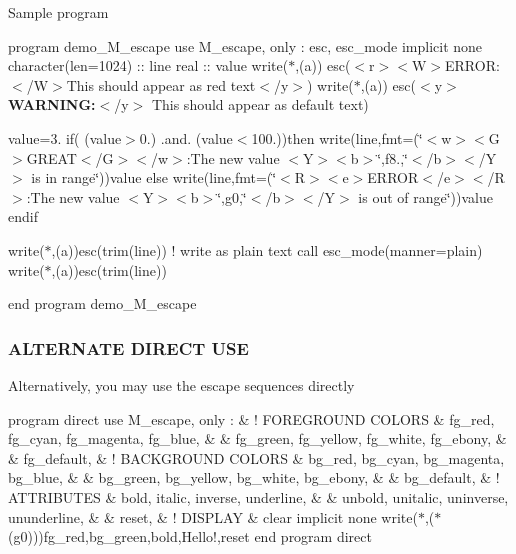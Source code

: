 Sample program

program demo\+\_\+\+M\+\_\+escape use M\+\_\+escape, only \+: esc, esc\+\_\+mode implicit none character(len=1024) \+:\+: line real \+:\+: value write($\ast$,\textquotesingle{}(a)\textquotesingle{}) esc(\textquotesingle{}$<$r$>$$<$\+W$>$E\+R\+R\+OR\+:$<$/\+W$>$This should appear as red text$<$/y$>$\textquotesingle{}) write($\ast$,\textquotesingle{}(a)\textquotesingle{}) esc(\textquotesingle{}$<$y$>${\bfseries W\+A\+R\+N\+I\+NG\+:}$<$/y$>$ This should appear as default text\textquotesingle{})

value=3. if( (value$>$0.) .and. (value$<$100.))then write(line,fmt=\textquotesingle{}(\char`\"{}$<$w$>$$<$\+G$>$\+G\+R\+E\+A\+T$<$/\+G$>$$<$/w$>$\+:\+The new value $<$\+Y$>$$<$b$>$\char`\"{},f8.,\char`\"{}$<$/b$>$$<$/\+Y$>$ is in range\char`\"{})\textquotesingle{})value else write(line,fmt=\textquotesingle{}(\char`\"{}$<$\+R$>$$<$e$>$\+E\+R\+R\+O\+R$<$/e$>$$<$/\+R$>$\+:\+The new value $<$\+Y$>$$<$b$>$\char`\"{},g0,\char`\"{}$<$/b$>$$<$/\+Y$>$ is out of range\char`\"{})\textquotesingle{})value endif

write($\ast$,\textquotesingle{}(a)\textquotesingle{})esc(trim(line)) ! write as plain text call esc\+\_\+mode(manner=\textquotesingle{}plain\textquotesingle{}) write($\ast$,\textquotesingle{}(a)\textquotesingle{})esc(trim(line))

end program demo\+\_\+\+M\+\_\+escape

\subsubsection*{A\+L\+T\+E\+R\+N\+A\+TE D\+I\+R\+E\+CT U\+SE}

Alternatively, you may use the escape sequences directly

program direct use M\+\_\+escape, only \+: \& ! F\+O\+R\+E\+G\+R\+O\+U\+ND C\+O\+L\+O\+RS \& fg\+\_\+red, fg\+\_\+cyan, fg\+\_\+magenta, fg\+\_\+blue, \& \& fg\+\_\+green, fg\+\_\+yellow, fg\+\_\+white, fg\+\_\+ebony, \& \& fg\+\_\+default, \& ! B\+A\+C\+K\+G\+R\+O\+U\+ND C\+O\+L\+O\+RS \& bg\+\_\+red, bg\+\_\+cyan, bg\+\_\+magenta, bg\+\_\+blue, \& \& bg\+\_\+green, bg\+\_\+yellow, bg\+\_\+white, bg\+\_\+ebony, \& \& bg\+\_\+default, \& ! A\+T\+T\+R\+I\+B\+U\+T\+ES \& bold, italic, inverse, underline, \& \& unbold, unitalic, uninverse, ununderline, \& \& reset, \& ! D\+I\+S\+P\+L\+AY \& clear implicit none write($\ast$,\textquotesingle{}($\ast$(g0))\textquotesingle{})fg\+\_\+red,bg\+\_\+green,bold,\textquotesingle{}Hello!\textquotesingle{},reset end program direct

